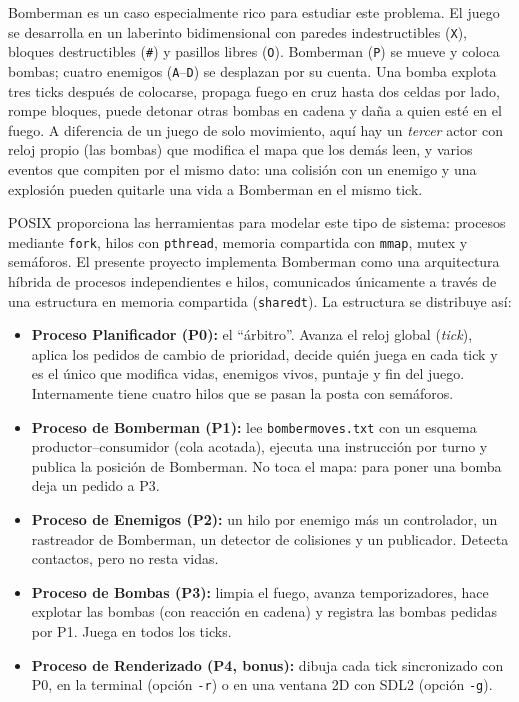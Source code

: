 \documentclass[11pt,a4paper]{article}
\newcommand{\cod}[1]{\texttt{#1}}
\renewcommand{\_}{\textunderscore\allowbreak}
\begin{document}
Bomberman es un caso especialmente rico para estudiar este problema. El juego se desarrolla en un laberinto bidimensional con paredes indestructibles (\cod{X}), bloques destructibles (\cod{\#}) y pasillos libres (\cod{O}). Bomberman (\cod{P}) se mueve y coloca bombas; cuatro enemigos (\cod{A}--\cod{D}) se desplazan por su cuenta. Una bomba explota tres ticks después de colocarse, propaga fuego en cruz hasta dos celdas por lado, rompe bloques, puede detonar otras bombas en cadena y daña a quien esté en el fuego. A diferencia de un juego de solo movimiento, aquí hay un \emph{tercer} actor con reloj propio (las bombas) que modifica el mapa que los demás leen, y varios eventos que compiten por el mismo dato: una colisión con un enemigo y una explosión pueden quitarle una vida a Bomberman en el mismo tick.

POSIX proporciona las herramientas para modelar este tipo de sistema: procesos mediante \cod{fork}, hilos con \cod{pthread}, memoria compartida con \cod{mmap}, mutex y semáforos. El presente proyecto implementa Bomberman como una arquitectura híbrida de procesos independientes e hilos, comunicados únicamente a través de una estructura en memoria compartida (\cod{shared\_t}). La estructura se distribuye así:

\begin{itemize}
  \item \textbf{Proceso Planificador (P0):} el ``árbitro''. Avanza el reloj global (\emph{tick}), aplica los pedidos de cambio de prioridad, decide quién juega en cada tick y es el único que modifica vidas, enemigos vivos, puntaje y fin del juego. Internamente tiene cuatro hilos que se pasan la posta con semáforos.
  \item \textbf{Proceso de Bomberman (P1):} lee \cod{bomber\_moves.txt} con un esquema productor--consumidor (cola acotada), ejecuta una instrucción por turno y publica la posición de Bomberman. No toca el mapa: para poner una bomba deja un pedido a P3.
  \item \textbf{Proceso de Enemigos (P2):} un hilo por enemigo más un controlador, un rastreador de Bomberman, un detector de colisiones y un publicador. Detecta contactos, pero no resta vidas.
  \item \textbf{Proceso de Bombas (P3):} limpia el fuego, avanza temporizadores, hace explotar las bombas (con reacción en cadena) y registra las bombas pedidas por P1. Juega en todos los ticks.
  \item \textbf{Proceso de Renderizado (P4, bonus):} dibuja cada tick sincronizado con P0, en la terminal (opción \cod{-r}) o en una ventana 2D con SDL2 (opción \cod{-g}).
\end{itemize}
\end{document}
